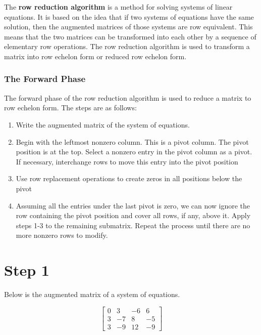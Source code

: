 \documentclass[
  letterpaper,
  DIV=11,
  numbers=noendperiod]{scrreprt}
\providecommand{\tightlist}{%
  \setlength{\itemsep}{0pt}\setlength{\parskip}{0pt}}\usepackage{longtable,booktabs,array}
\begin{document}

The \textbf{row reduction algorithm} is a method for solving systems of
linear equations. It is based on the idea that if two systems of
equations have the same solution, then the augmented matrices of those
systems are row equivalent. This means that the two matrices can be
transformed into each other by a sequence of elementary row operations.
The row reduction algorithm is used to transform a matrix into row
echelon form or reduced row echelon form.

\hypertarget{the-forward-phase}{%
\subsection*{The Forward Phase}\label{the-forward-phase}}

The forward phase of the row reduction algorithm is used to reduce a
matrix to row echelon form. The steps are as follows:

\begin{enumerate}
\def\labelenumi{\arabic{enumi}.}
\tightlist
\item
  Write the augmented matrix of the system of equations.
\item
  Begin with the leftmost nonzero column. This is a pivot column. The
  pivot position is at the top. Select a nonzero entry in the pivot
  column as a pivot. If necessary, interchange rows to move this entry
  into the pivot position
\item
  Use row replacement operations to create zeros in all positions below
  the pivot
\item
  Assuming all the entries under the last pivot is zero, we can now
  ignore the row containing the pivot position and cover all rows, if
  any, above it. Apply steps 1-3 to the remaining submatrix. Repeat the
  process until there are no more nonzero rows to modify.
\end{enumerate}

\chapter{Step 1}

Below is the augmented matrix of a system of equations.

\[
\begin{bmatrix}
    0 & 3 & -6 & 6 \\
    3 & -7 & 8 & -5 \\
    3 & -9 & 12 & -9
\end{bmatrix}
\]
\end{document}

